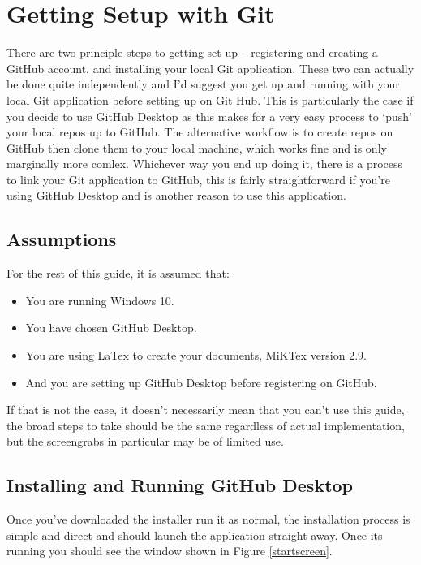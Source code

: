\documentclass[a4paper, 12pt]{article}
\begin{document}
\section{Getting Setup with Git}
There are two principle steps to getting set up -- registering and creating a GitHub account, and installing your local Git application. These two can actually be done quite independently and I'd suggest you get up and running with your local Git application before setting up on Git Hub. This is particularly the case if you decide to use GitHub Desktop as this makes for a very easy process to `push' your local repos up to GitHub. The alternative workflow is to create repos on GitHub then clone them to your local machine, which works fine and is only marginally more comlex. Whichever way you end up doing it, there is a process to link your Git application to GitHub, this is fairly straightforward if you're using GitHub Desktop and is another reason to use this application.

\subsection{Assumptions}
For the rest of this guide, it is assumed that:
\begin{itemize}
\item You are running Windows 10.
\item You have chosen GitHub Desktop.
\item You are using LaTex to create your documents, MiKTex version 2.9.
\item And you are setting up GitHub Desktop before registering on GitHub.
\end{itemize}
If that is not the case, it doesn't necessarily mean that you can't use this guide, the broad steps to take should be the same regardless of actual implementation, but the screengrabs in particular may be of limited use.

\subsection{Installing and Running GitHub Desktop}
Once you've downloaded the installer run it as normal, the installation process is simple and direct and should launch the application straight away. Once its running you should see the window shown in Figure \ref{startscreen}.
\end{document}
